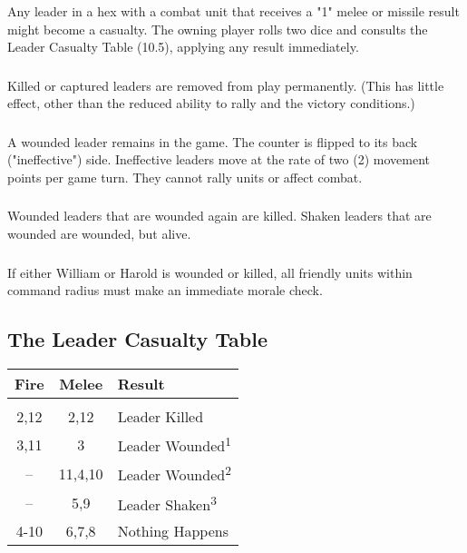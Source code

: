 \subsubsection[Possible Casualty]{} Any leader in a hex with a combat unit that receives a "1" melee or missile result might become a casualty. The owning player rolls two dice and consults the Leader Casualty Table (10.5), applying any result immediately.

\subsubsection[Killed or Captured]{} Killed or captured leaders are removed from play permanently. (This has little effect, other than the reduced ability to rally and the victory conditions.)

\subsubsection[Wounded]{} A wounded leader remains in the game. The counter is flipped to its back ("ineffective") side. Ineffective leaders move at the rate of two (2) movement points per game turn. They cannot rally units or affect combat.

\subsubsection[Wounded Again]{} Wounded leaders that are wounded again are killed. Shaken leaders that are wounded are wounded, but alive.

\subsubsection[William and Harold]{} If either William or Harold is wounded or killed, all friendly units within command radius must make an immediate morale check.

\subsection{The Leader Casualty Table}

\begin{tabular}{ ccl }
  \textbf{Fire} & \textbf{Melee} & \textbf{Result} \\
  \hline \\ [-2.0ex]
  2,12 & 2,12 & Leader Killed \\
  3,11 & 3 & Leader Wounded\textsuperscript{1} \\
  -- & 11,4,10 & Leader Wounded\textsuperscript{2} \\
  -- & 5,9 & Leader Shaken\textsuperscript{3} \\
  4-10 & 6,7,8 & Nothing Happens \\
  \hline
\end{tabular}

